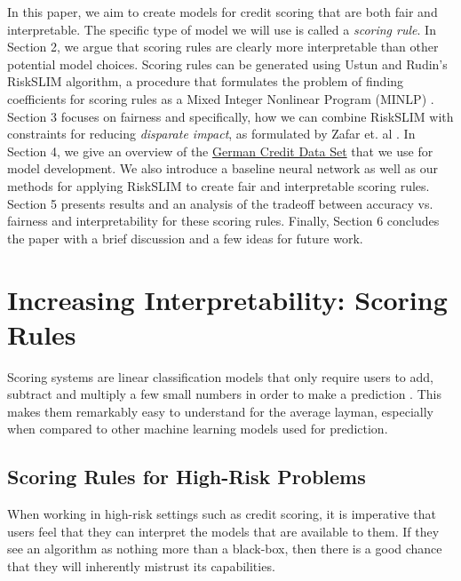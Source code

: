 \documentclass[11pt, margin=1in]{article}
\begin{document}
In this paper, we aim to create models for credit scoring that are both fair and interpretable.  The specific type of model we will use is called a \emph{scoring rule}.  In Section 2, we argue that scoring rules are clearly more interpretable than other potential model choices.  Scoring rules can be generated using Ustun and Rudin's RiskSLIM algorithm, a procedure that formulates the problem of finding coefficients for scoring rules as a Mixed Integer Nonlinear Program (MINLP) \cite{risk-slim}.  Section 3 focuses on fairness and specifically, how we can combine RiskSLIM with constraints for reducing \emph{disparate impact}, as formulated by Zafar et. al \cite{disparate-impact}.  In Section 4, we give an overview of the \href{https://archive.ics.uci.edu/ml/datasets/statlog+(german+credit+data)}{German Credit Data Set} that we use for model development.  We also introduce a baseline neural network as well as our methods for applying RiskSLIM to create fair and interpretable scoring rules.  Section 5 presents results and an analysis of the tradeoff between accuracy vs. fairness and interpretability for these scoring rules.  Finally, Section 6 concludes the paper with a brief discussion and a few ideas for future work.    

\section{Increasing Interpretability: Scoring Rules}

Scoring systems are linear classification models that only require users to add, subtract and multiply a few small numbers in order to make a prediction \cite{slim}.  This makes them remarkably easy to understand for the average layman, especially when compared to other machine learning models used for prediction.  

\subsection{Scoring Rules for High-Risk Problems}
When working in high-risk settings such as credit scoring, it is imperative that users feel that they can interpret the models that are available to them.  If they see an algorithm as nothing more than a black-box, then there is a good chance that they will inherently mistrust its capabilities.  
\end{document}
